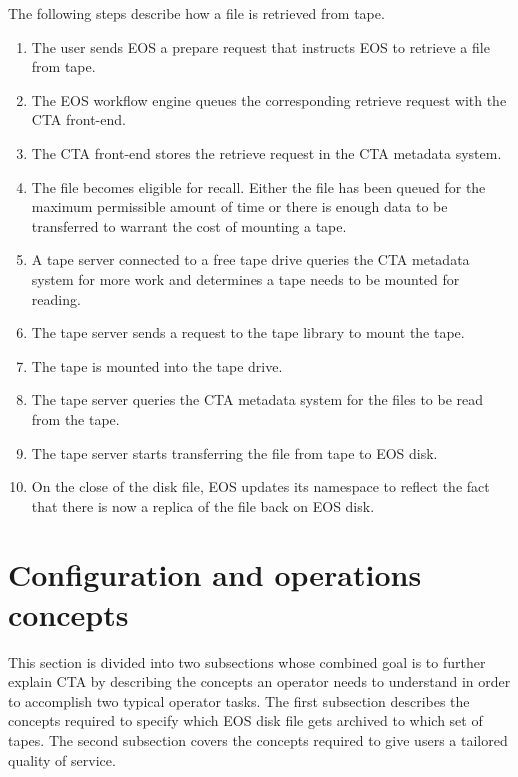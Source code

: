\documentclass[a4paper]{jpconf}
\begin{document}
The following steps describe how a file is retrieved from tape.
\begin{enumerate}
  \item The user sends EOS a prepare request that instructs EOS to retrieve a
  file from tape.
  \item The EOS workflow engine queues the corresponding retrieve request with
  the CTA front-end.
  \item The CTA front-end stores the retrieve request in the CTA metadata
  system.
  \item The file becomes eligible for recall.  Either the file has been
  queued for the maximum permissible amount of time or there is enough data to
  be transferred to warrant the cost of mounting a tape.
  \item A tape server connected to a free tape drive queries the CTA metadata
  system for more work and determines a tape needs to be mounted for reading.
  \item The tape server sends a request to the tape library to mount the tape.
  \item The tape is mounted into the tape drive.
  \item The tape server queries the CTA metadata system for the files to be read
  from the tape.
  \item The tape server starts transferring the file from tape to EOS disk.
  \item On the close of the disk file, EOS updates its namespace to reflect the
  fact that there is now a replica of the file back on EOS disk.
\end{enumerate}

\section{Configuration and operations concepts} \label{concepts}
This section is divided into two subsections whose combined goal is to further
explain CTA by describing the concepts an operator needs to understand in order
to accomplish two typical operator tasks.  The first subsection describes the
concepts required to specify which EOS disk file gets archived to which set of
tapes.  The second subsection covers the concepts required to give users a
tailored quality of service.
\end{document}
